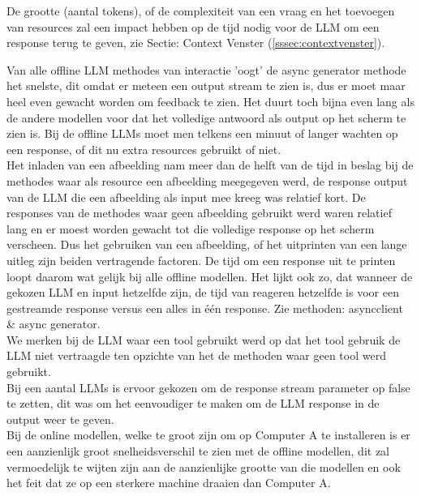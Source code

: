 De grootte (aantal tokens), of de complexiteit van een vraag en het toevoegen van resources zal een impact hebben op de tijd nodig voor de LLM om een response terug te geven, zie Sectie: Context Venster (\ref{sssec:contextvenster}).

Van alle offline LLM methodes van interactie 'oogt' de async generator methode het snelste, dit omdat er meteen een output stream te zien is, dus er moet maar heel even gewacht worden om feedback te zien. Het duurt toch bijna even lang als de andere modellen voor dat het volledige antwoord als output op het scherm te zien is. Bij de offline LLMs moet men telkens een minuut of langer wachten op een response, of dit nu extra resources gebruikt of niet. \\

Het inladen van een afbeelding nam meer dan de helft van de tijd in beslag bij de methodes waar als resource een afbeelding meegegeven werd, de response output van de LLM die een afbeelding als input mee kreeg was relatief kort. De responses van de methodes waar geen afbeelding gebruikt werd waren relatief lang en er moest worden gewacht tot die volledige response op het scherm verscheen. Dus het gebruiken van een afbeelding, of het uitprinten van een lange uitleg zijn beiden vertragende factoren. De tijd om een response uit te printen loopt daarom wat gelijk bij alle offline modellen. Het lijkt ook zo, dat wanneer de gekozen LLM en input hetzelfde zijn, de tijd van reageren hetzelfde is voor een gestreamde response versus een alles in één response. Zie methoden: asyncclient \& async generator.\\

We merken bij de LLM waar een tool gebruikt werd op dat het tool gebruik de LLM niet vertraagde ten opzichte van het de methoden waar geen tool werd gebruikt. \\

Bij een aantal LLMs is ervoor gekozen om de response stream parameter op false te zetten, dit was om het eenvoudiger te maken om de LLM response in de output weer te geven. \\

Bij de online modellen, welke te groot zijn om op Computer A te installeren is er een aanzienlijk groot snelheidsverschil te zien met de offline modellen, dit zal vermoedelijk te wijten zijn aan de aanzienlijke grootte van die modellen en ook het feit dat ze op een sterkere machine draaien dan Computer A. \\

